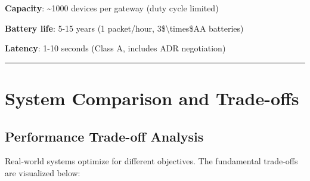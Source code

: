\textbf{Capacity}: \textasciitilde1000 devices per gateway (duty cycle
limited)

\textbf{Battery life}: 5-15 years (1 packet/hour,
3\$\textbackslash times\$AA batteries)

\textbf{Latency}: 1-10 seconds (Class A, includes ADR negotiation)

\begin{center}\rule{0.5\linewidth}{0.5pt}\end{center}

\section{System Comparison and Trade-offs}
\label{sec:comparison}

\subsection{Performance Trade-off Analysis}

Real-world systems optimize for different objectives. The fundamental trade-offs are visualized below:

